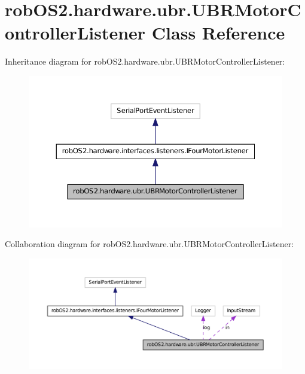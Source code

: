 \hypertarget{classrob_o_s2_1_1hardware_1_1ubr_1_1_u_b_r_motor_controller_listener}{
\section{robOS2.hardware.ubr.UBRMotorControllerListener Class Reference}
\label{classrob_o_s2_1_1hardware_1_1ubr_1_1_u_b_r_motor_controller_listener}
}


Inheritance diagram for robOS2.hardware.ubr.UBRMotorControllerListener:\nopagebreak
\begin{figure}[H]
\begin{center}
\leavevmode
\includegraphics[width=366pt]{classrob_o_s2_1_1hardware_1_1ubr_1_1_u_b_r_motor_controller_listener__inherit__graph}
\end{center}
\end{figure}


Collaboration diagram for robOS2.hardware.ubr.UBRMotorControllerListener:\nopagebreak
\begin{figure}[H]
\begin{center}
\leavevmode
\includegraphics[width=400pt]{classrob_o_s2_1_1hardware_1_1ubr_1_1_u_b_r_motor_controller_listener__coll__graph}
\end{center}
\end{figure}
